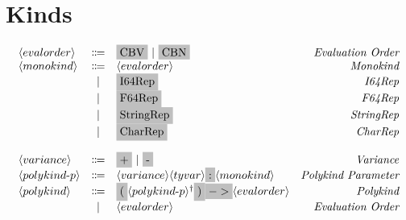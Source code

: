 \section{Kinds}
\[
  \begin{array}{lclr}
    \nonterminal{evalorder} & \Coloneqq & \terminal{CBV}\ |\ \terminal{CBN} & \emph{Evaluation Order} \\
    \nonterminal{monokind} & \Coloneqq & \nonterminal{evalorder} & \emph{Monokind} \\
    & | & \terminal{I64Rep} & \emph{I64Rep} \\
    & | & \terminal{F64Rep} & \emph{F64Rep} \\
    & | & \terminal{StringRep} & \emph{StringRep} \\
    & | & \terminal{CharRep} & \emph{CharRep} \\[4mm]
    \nonterminal{variance} & \Coloneqq & \terminal{+}\ |\ \terminal{-} & \emph{Variance} \\
    \nonterminal{polykind$-$p} & \Coloneqq & \nonterminal{variance}\nonterminal{tyvar} \terminal{:} \nonterminal{monokind} & \emph{Polykind Parameter} \\
    \nonterminal{polykind} & \Coloneqq & \terminal{(} \commalist{\nonterminal{polykind$-$p}}\terminal{)} \terminal{$->$} \nonterminal{evalorder} & \emph{Polykind} \\
    & | & \nonterminal{evalorder} & \emph{Evaluation Order}
  \end{array}
\]
